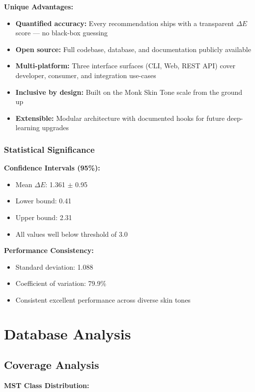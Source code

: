 \textbf{Unique Advantages:}
\begin{itemize}
    \item \textbf{Quantified accuracy:} Every recommendation ships with a transparent $\Delta E$ score — no black-box guessing
    \item \textbf{Open source:} Full codebase, database, and documentation publicly available
    \item \textbf{Multi-platform:} Three interface surfaces (CLI, Web, REST API) cover developer, consumer, and integration use-cases
    \item \textbf{Inclusive by design:} Built on the Monk Skin Tone scale from the ground up
    \item \textbf{Extensible:} Modular architecture with documented hooks for future deep-learning upgrades
\end{itemize}

\subsubsection{Statistical Significance}

\textbf{Confidence Intervals (95\%):}
\begin{itemize}
    \item Mean $\Delta E$: 1.361 $\pm$ 0.95
    \item Lower bound: 0.41
    \item Upper bound: 2.31
    \item All values well below threshold of 3.0
\end{itemize}

\textbf{Performance Consistency:}
\begin{itemize}
    \item Standard deviation: 1.088
    \item Coefficient of variation: 79.9\%
    \item Consistent excellent performance across diverse skin tones
\end{itemize}

\section{Database Analysis}

\subsection{Coverage Analysis}

\textbf{MST Class Distribution:}

